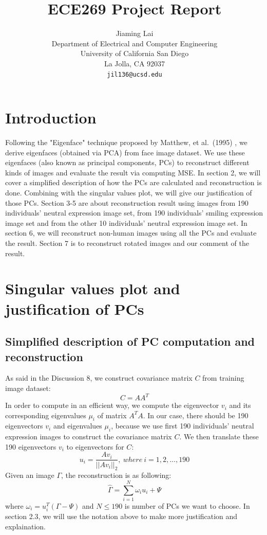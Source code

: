 \documentclass{article}
\title{ECE269 Project Report}
\author{
  Jiaming Lai\\
  Department of Electrical and Computer Engineering\\
  University of California San Diego\\
  La Jolla, CA 92037 \\
  \texttt{jil136@ucsd.edu} \\
}
\begin{document}
\maketitle


\section{Introduction}
Following the "Eigenface" technique proposed by Matthew, et al.\ (1995)
\cite{eigenface1}\cite{eigenface2}, we derive eigenfaces (obtained via PCA) from face image
dataset. We use these eigenfaces (also known as principal components, PCs) to reconstruct different
kinds of images and evaluate the result via computing MSE. In section 2, we will cover a simplified
description of how the PCs are calculated and reconstruction is done. Combining with the singular 
values plot, we will give our justification of those PCs. Section 3-5 are about reconstruction result
using images from 190 individuals’ neutral expression image set, from 190 individuals’ smiling expression
image set and from the other 10 individuals’ neutral expression image set. In section 6, we will reconstruct
non-human images using all the PCs and evaluate the result. Section 7 is to reconstruct rotated images
and our comment of the result.

\section{Singular values plot and justification of PCs}
\subsection{Simplified description of PC computation and reconstruction}
As said in the Discussion 8, we construct covariance matrix $C$ from training image dataset:
\begin{equation}
  C = AA^T \nonumber
\end{equation}
In order to compute in an efficient way, we compute the eigenvector $v_i$ and its corresponding eigenvalues
$\mu_i$ of matrix $A^TA$. In our case, there should be 190 eigenvectors $v_i$ and eigenvalues $\mu_i$, because
we use first 190 individuals' neutral expression images to construct the covariance matrix $C$. We then translate
these 190 eigenvectors $v_i$ to eigenvectors for $C$:
\begin{equation}
  u_i = \frac{Av_i}{||Av_i||_2},\ where\ i=1,2,\ldots,190 \nonumber
\end{equation}
Given an image $\Gamma$, the reconstruction is as 
following:
\begin{equation}
  \hat{\Gamma} = \sum_{i=1}^{N}\omega_iu_i+\Psi \nonumber
\end{equation}
where $\omega_i=u_i^T(\Gamma-\Psi)$ and $N \le 190$ is number of PCs we want to choose. In section 2.3, we will
use the notation above to make more justification and explaination.
\end{document}
